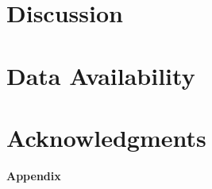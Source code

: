 

\section{Discussion}



\section*{Data Availability}



\section*{Acknowledgments}





\clearpage

\appendix



\clearpage

\setcounter{table}{0}
\setcounter{figure}{0}
\renewcommand{\thetable}{A\arabic{table}}
\renewcommand{\thefigure}{A\arabic{figure}}

\noindent \huge{\textbf{Appendix}}

\normalsize{}







